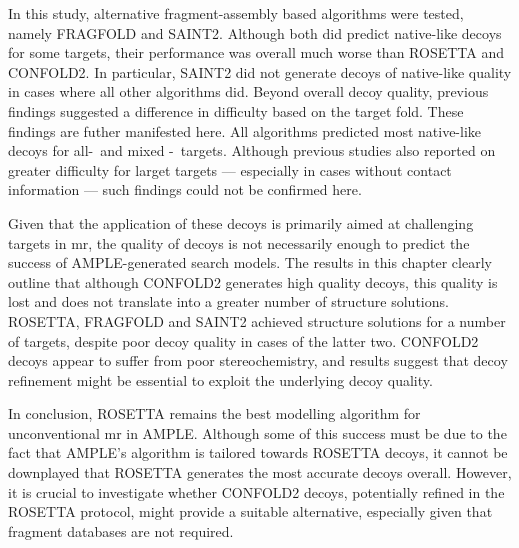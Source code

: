 In this study, alternative fragment-assembly based algorithms were tested, namely FRAGFOLD and SAINT2. Although both did predict native-like decoys for some targets, their performance was overall much worse than ROSETTA and CONFOLD2. In particular, SAINT2 did not generate decoys of native-like quality in cases where all other algorithms did. Beyond overall decoy quality, previous findings suggested a difference in difficulty based on the target fold. These findings are futher manifested here. All algorithms predicted most native-like decoys for all-\textalpha\ and mixed \textalpha-\textbeta\ targets. Although previous studies also reported on greater difficulty for larget targets --- especially in cases without contact information --- such findings could not be confirmed here.

Given that the application of these decoys is primarily aimed at challenging targets in \gls{mr}, the quality of decoys is not necessarily enough to predict the success of AMPLE-generated search models. The results in this chapter clearly outline that although CONFOLD2 generates high quality decoys, this quality is lost and does not translate into a greater number of structure solutions. ROSETTA, FRAGFOLD and SAINT2 achieved structure solutions for a number of targets, despite poor decoy quality in cases of the latter two. CONFOLD2 decoys appear to suffer from poor stereochemistry, and results suggest that decoy refinement might be essential to exploit the underlying decoy quality.

In conclusion, ROSETTA remains the best modelling algorithm for unconventional \gls{mr} in AMPLE. Although some of this success must be due to the fact that AMPLE's algorithm is tailored towards ROSETTA decoys, it cannot be downplayed that ROSETTA generates the most accurate decoys overall. However, it is crucial to investigate whether CONFOLD2 decoys, potentially refined in the ROSETTA protocol, might provide a suitable alternative, especially given that fragment databases are not required.

